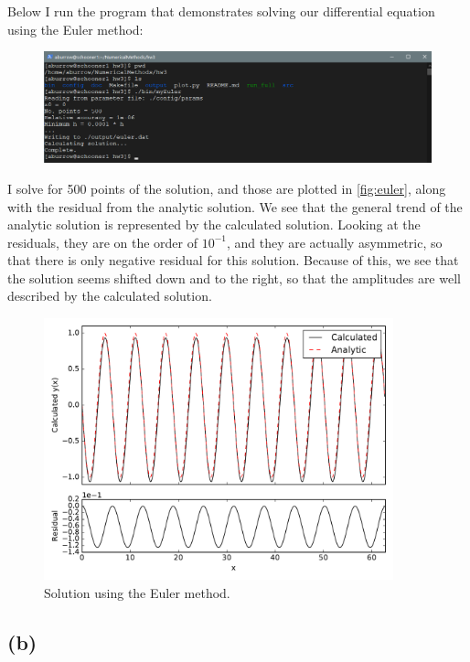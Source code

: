 \documentclass[12pt]{article}
\begin{document}
Below I run the program that demonstrates solving our differential equation
using the Euler method:
\begin{figure}[H]
    \centering
    \includegraphics[width=1\textwidth]{myEuler}
    \label{fig:myEuler}
\end{figure}
I solve for 500 points of the solution, and those are plotted in
\autoref{fig:euler}, along with the residual from the analytic solution. We see
that the general trend of the analytic solution is represented by the
calculated solution. Looking at the residuals, they are on the order of
$10^{-1}$, and they are actually asymmetric, so that there is only negative
residual for this solution. Because of this, we see that the solution seems
shifted down and to the right, so that the amplitudes are well described by
the calculated solution.
\begin{figure}[ht]
    \centering
    \includegraphics[width=0.9\textwidth]{euler}
    \caption{Solution using the Euler method.}
    \label{fig:euler}
\end{figure}

\subsection*{(b)}
\end{document}
